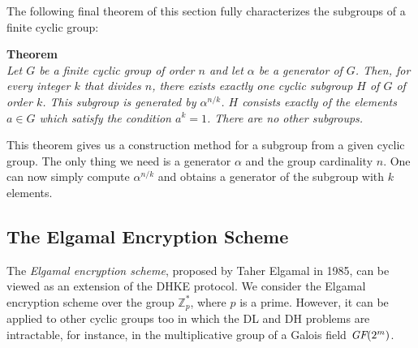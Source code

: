 The following final theorem of this section fully characterizes the subgroups of a finite cyclic group:
\begin{framed}
    \hfill\break\textbf{Theorem}\\
    \textit{Let $G$ be a finite cyclic group of order $n$ and let $\alpha$ be a generator of $G$. Then, for every integer $k$ that divides $n$, there exists exactly one cyclic subgroup $H$ of $G$ of order $k$. This subgroup is generated by $\alpha^{n/k}$. $H$ consists exactly of the elements $a\in G$ which satisfy the condition $a^k=1$. There are no other subgroups.}
\end{framed}
This theorem gives us a construction method for a subgroup from a given cyclic group. The only thing we need is a generator $\alpha$ and the group cardinality $n$. One can now simply compute $\alpha^{n/k}$ and obtains a generator of the subgroup with $k$ elements.

\newpage
\subsection{The Elgamal Encryption Scheme}
The \textit{Elgamal encryption scheme}, proposed by Taher Elgamal in 1985, can be viewed as an extension of the DHKE protocol. We consider the Elgamal encryption scheme over the group $\mathbb{Z}_p^*$, where $p$ is a prime. However, it can be applied to other cyclic groups too in which the DL and DH problems are intractable, for instance, in the multiplicative group of a Galois field $\textit{GF}(2^m)$.

